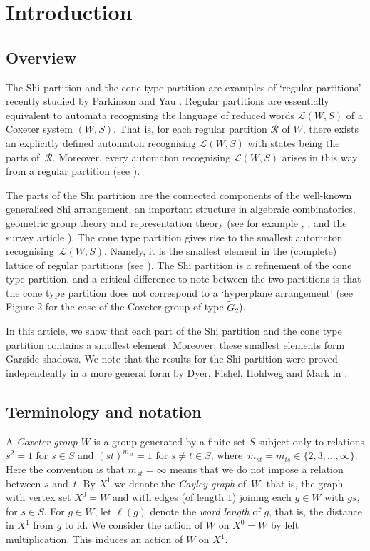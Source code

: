 \documentclass[11pt]{article}
\theoremstyle{definition}
\numberwithin{equation}{section}
\newcommand{\id}{\mathrm{id}}
\begin{document}
\section{Introduction}

\subsection*{Overview}
The Shi partition and the cone type partition are examples of `regular partitions' recently studied by Parkinson and Yau \cite{Parkinson-Yau_2022}. Regular partitions are essentially equivalent to automata recognising the language of reduced words $\mathcal{L}(W,S)$ of a Coxeter system $(W,S)$. That is, for each regular partition $\mathscr{R}$ of $W$, there exists an explicitly defined automaton recognising $\mathcal{L}(W,S)$ with states being the parts of~$\mathscr{R}$. Moreover, every automaton recognising $\mathcal{L}(W,S)$ arises in this way from a regular partition (see \cite[Thm.~2]{Parkinson-Yau_2022}).

The parts of the Shi partition are the connected components of the well-known generalised Shi arrangement, an important structure in algebraic combinatorics, geometric group theory and representation theory (see for example \cite{DH}, \cite{DHFM}, and the survey article \cite{MR3969572}). The cone type partition gives rise to the smallest automaton recognising~$\mathcal{L}(W,S)$. Namely, it is the smallest element in the (complete) lattice of regular partitions (see \cite[Thm.~3 and Cor.~4]{Parkinson-Yau_2022}). The Shi partition is a refinement of the cone type partition, and a critical difference to note between the two partitions is that the cone type partition does not correspond to a `hyperplane arrangement' (see Figure 2 for the case of the Coxeter group of type $\widetilde{G}_2$).

In this article, we show that each part of the Shi partition and the cone type partition contains a smallest element. Moreover, these smallest elements form Garside shadows. We note that the results for the Shi partition were proved independently in a more general form by Dyer, Fishel, Hohlweg and Mark in \cite[Thm.~1.1(1)]{DHFM}.

\subsection*{Terminology and notation} 

A \emph{Coxeter group} $W$ is a group generated by a finite set $S$ subject only to relations $s^2=1$
for $s\in S$ and $(st)^{m_{st}}=1$ for $s\neq t\in S$, where~$m_{st}=m_{ts}\in \{2,3,\ldots,\infty\}$. Here the convention is that $m_{st}=\infty$
means that we do not impose a relation between $s$ and~$t$. By $X^1$ we denote the \emph{Cayley graph} of~$W$, that is, the graph with vertex set $X^0=W$
and with edges (of length $1$) joining each $g\in W$ with $gs$, for $s\in S$. For $g\in W$, let $\ell(g)$ denote the \emph{word length} of $g$, that is, the distance in $X^1$ from $g$ to $\id$.
We
consider the action of $W$ on $X^0=W$ by left multiplication. This induces an action of $W$ on $X^1$.
\end{document}
